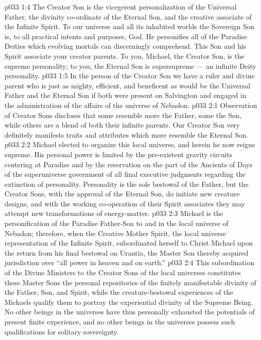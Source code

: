 \vs p033 1:4 The Creator Son is the vicegerent personalization of the Universal Father, the divinity co\hyp{}ordinate of the Eternal Son, and the creative associate of the Infinite Spirit. To our universe and all its inhabited worlds the Sovereign Son is, to all practical intents and purposes, God. He personifies all of the Paradise Deities which evolving mortals can discerningly comprehend. This Son and his Spirit associate  your creator parents. To you, Michael, the Creator Son, is the supreme personality; to you, the Eternal Son is supersupreme --- an infinite Deity personality.
\vs p033 1:5 \pc In the person of the Creator Son we have a ruler and divine parent who is just as mighty, efficient, and beneficent as would be the Universal Father and the Eternal Son if both were present on Salvington and engaged in the administration of the affairs of the universe of Nebadon.
\vs p033 2:1 Observation of Creator Sons discloses that some resemble more the Father, some the Son, while others are a blend of both their infinite parents. Our Creator Son very definitely manifests traits and attributes which more resemble the Eternal Son.
\vs p033 2:2 Michael elected to organize this local universe, and herein he now reigns supreme. His personal power is limited by the pre\hyp{}existent gravity circuits centering at Paradise and by the reservation on the part of the Ancients of Days of the superuniverse government of all final executive judgments regarding the extinction of personality. Personality is the sole bestowal of the Father, but the Creator Sons, with the approval of the Eternal Son, do initiate new creature designs, and with the working co\hyp{}operation of their Spirit associates they may attempt new transformations of energy\hyp{}matter.
\vs p033 2:3 \pc Michael is the personification of the Paradise Father\hyp{}Son to and in the local universe of Nebadon; therefore, when the Creative Mother Spirit, the local universe representation of the Infinite Spirit, subordinated herself to Christ Michael upon the return from his final bestowal on Urantia, the Master Son thereby acquired jurisdiction over “all power in heaven and on earth.”
\vs p033 2:4 This subordination of the Divine Ministers to the Creator Sons of the local universes constitutes these Master Sons the personal repositories of the finitely manifestable divinity of the Father, Son, and Spirit, while the creature\hyp{}bestowal experiences of the Michaels qualify them to portray the experiential divinity of the Supreme Being. No other beings in the universes have thus personally exhausted the potentials of present finite experience, and no other beings in the universes possess such qualifications for solitary sovereignty.
